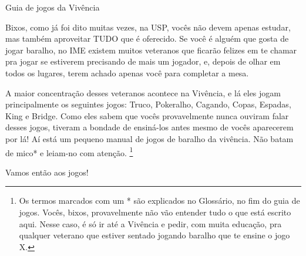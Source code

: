 \begin{secao}{Guia de jogos da Vivência }

Bixos, como já foi dito muitas vezes, na USP, vocês não devem apenas estudar, mas
também aproveitar TUDO que é oferecido. Se você é alguém que gosta de jogar
baralho, no IME existem muitos veteranos que ficarão felizes em te chamar pra
jogar se estiverem precisando de mais um jogador, e, depois de olhar em todos
os lugares, terem achado apenas você para completar a mesa. 

A maior concentração desses veteranos acontece na Vivência, e lá eles jogam
principalmente os seguintes jogos: Truco, Pokeralho, Cagando, Copas, Espadas,
King e Bridge. Como eles sabem que vocês provavelmente nunca ouviram falar desses jogos,
tiveram a bondade de ensiná-los antes mesmo de vocês aparecerem por lá! Aí está um
pequeno manual de jogos de baralho da vivência. Não batam de mico* e
leiam-no com atenção. \footnote{Os termos marcados com um * são explicados no Glossário, no fim do guia de
jogos. Vocês, bixos, provavelmente não vão entender tudo o que está escrito aqui.
Nesse caso, é só ir até a Vivência e pedir, com muita educação, pra qualquer 
veterano que estiver sentado jogando baralho que te ensine o jogo X.}

Vamos então aos jogos!











\end{secao}
